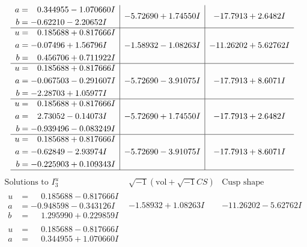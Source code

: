 \documentclass[1p]{elsarticle_modified}
\theoremstyle{definition}
\newcommand{\I}{\sqrt{-1}}
\begin{document}
$$\begin{array}{c|c|c}
\begin{aligned}
a &= \phantom{-}0.344955 - 1.070660 I \\
b &= -0.62210 - 2.20652 I\end{aligned}
 & -5.72690 + 1.74550 I & -17.7913 + 2.6482 I \\ \hline\begin{aligned}
u &= \phantom{-}0.185688 + 0.817666 I \\
a &= -0.07496 + 1.56796 I \\
b &= \phantom{-}0.456706 + 0.711922 I\end{aligned}
 & -1.58932 - 1.08263 I & -11.26202 + 5.62762 I \\ \hline\begin{aligned}
u &= \phantom{-}0.185688 + 0.817666 I \\
a &= -0.067503 - 0.291607 I \\
b &= -2.28703 + 1.05977 I\end{aligned}
 & -5.72690 - 3.91075 I & -17.7913 + 8.6071 I \\ \hline\begin{aligned}
u &= \phantom{-}0.185688 + 0.817666 I \\
a &= \phantom{-}2.73052 - 0.14073 I \\
b &= -0.939496 - 0.083249 I\end{aligned}
 & -5.72690 + 1.74550 I & -17.7913 + 2.6482 I \\ \hline\begin{aligned}
u &= \phantom{-}0.185688 + 0.817666 I \\
a &= -0.62849 - 2.93974 I \\
b &= -0.225903 + 0.109343 I\end{aligned}
 & -5.72690 - 3.91075 I & -17.7913 + 8.6071 I\\
 \hline 
 \end{array}$$\newpage$$\begin{array}{c|c|c}  
\text{Solutions to }I^u_{3}& \I (\text{vol} + \sqrt{-1}CS) & \text{Cusp shape}\\
 \hline 
\begin{aligned}
u &= \phantom{-}0.185688 - 0.817666 I \\
a &= -0.948598 - 0.343126 I \\
b &= \phantom{-}1.295990 + 0.229859 I\end{aligned}
 & -1.58932 + 1.08263 I & -11.26202 - 5.62762 I \\ \hline\begin{aligned}
u &= \phantom{-}0.185688 - 0.817666 I \\
a &= \phantom{-}0.344955 + 1.070660 I \\

\end{aligned}
\end{array}$$
\end{document}

